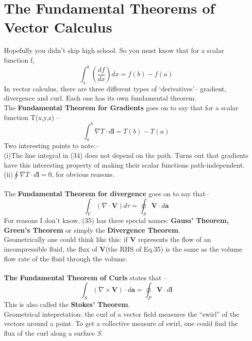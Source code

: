 \documentclass[12pt]{article}
\begin{document}
\section{The Fundamental Theorems of Vector Calculus}
Hopefully you didn't skip high school. So you must know that for a scalar function f,
\begin{equation}
    \int_{a}^{b}\left(\frac{df}{dx}\right)dx=f(b)-f(a)
\end{equation}
In vector calculus, there are three different types of `derivatives'-- gradient, divergence and curl.
Each one has its own fundamental theorem. \\
The \textbf{Fundamental Theorem for Gradients} goes on to say that for a scalar function T(x,y,z) -- 
\begin{equation}
    \int_{a}^{b}\nabla T\cdot d\mathbf{l}=T(b)-T(a)
\end{equation}
Two interesting points to note:--\\
(i)The line integral in (34) does not depend on the path. Turns out that gradients have this interesting property of making their scalar functions path-independent. \\
(ii)$\oint\nabla T\cdot d\mathbf{l}=0$, for obvious reasons.
\\ 
\\
The \textbf{Fundamental Theorem for divergence} goes on to say that--
\begin{equation}
    \int_{V}(\nabla\cdot\mathbf{V})d\tau = \oint_{S}\mathbf{V}\cdot d\mathbf{a}
\end{equation}
For reasons I don't know, (35) has three special names: \textbf{Gauss' Theorem, Green's Theorem} or simply the \textbf{Divergence Theorem}.\\
Geometrically one could think like this: if \textbf{V} represents the flow of an incompressible fluid, the flux of \textbf{V}(the RHS of Eq.35) is the same as the volume flow rate of the fluid through the volume.\\
\\
\textbf{The Fundamental Theorem of Curls} states that --
\begin{equation}
    \int_{S}(\nabla \times \mathbf{V})\cdot d\mathbf{a}=\oint_{P}\mathbf{V}\cdot d\mathbf{l}
\end{equation}
This is also called the \textbf{Stokes' Theorem}. \\
Geometrical intepretation: the curl of a vector field measures the ``swirl'' of the vectors around a point. To get a collective measure of swirl, one could find the flux of the curl along a surface \textit{S}.
\end{document}
